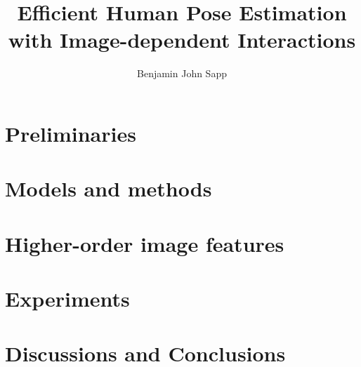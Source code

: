 \documentclass[12pt]{report}%
\theoremstyle{plain} \newtheorem{problem}{Problem}
\begin{document}

\newcommand{\mytitle}{Efficient Human Pose Estimation with Image-dependent 
Interactions}
\newcommand{\MYTITLE}{EFFICIENT HUMAN POSE ESTIMATION WITH IMAGE-DEPENDENT 
INTERACTIONS}

\title{\mytitle}
\author{Benjamin John Sapp}


  
 \beforepreface
\newpage
\copyrightpage
{}

\newpage
\abstractp

\afterpreface
% 

\newpage
{}
\pagestyle{plain}


\part{Preliminaries}




\clearpage
\part{Models and methods}




\clearpage
\part{Higher-order image features}


\clearpage
\part{Experiments}\label{sec:experiments}


\clearpage
\part{Discussions and Conclusions}



\clearpage


\end{document}
